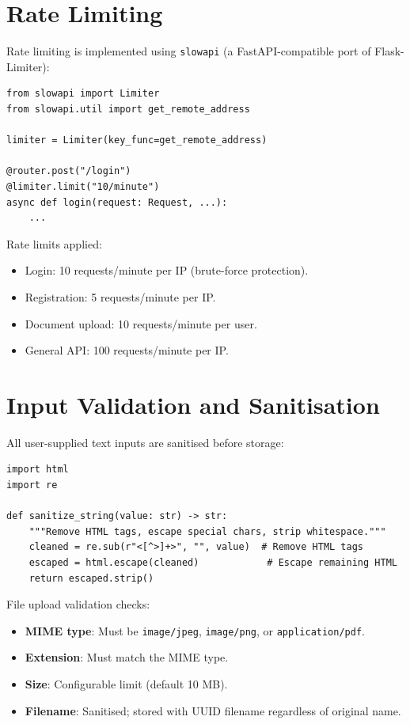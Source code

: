 \section{Rate Limiting}

Rate limiting is implemented using \texttt{slowapi} (a FastAPI-compatible port of Flask-Limiter):

\begin{lstlisting}[style=pythonstyle, caption=Rate Limiting Configuration]
from slowapi import Limiter
from slowapi.util import get_remote_address

limiter = Limiter(key_func=get_remote_address)

@router.post("/login")
@limiter.limit("10/minute")
async def login(request: Request, ...):
    ...
\end{lstlisting}

Rate limits applied:
\begin{itemize}
    \item Login: 10 requests/minute per IP (brute-force protection).
    \item Registration: 5 requests/minute per IP.
    \item Document upload: 10 requests/minute per user.
    \item General API: 100 requests/minute per IP.
\end{itemize}

\section{Input Validation and Sanitisation}

All user-supplied text inputs are sanitised before storage:

\begin{lstlisting}[style=pythonstyle, caption=Input Sanitisation]
import html
import re

def sanitize_string(value: str) -> str:
    """Remove HTML tags, escape special chars, strip whitespace."""
    cleaned = re.sub(r"<[^>]+>", "", value)  # Remove HTML tags
    escaped = html.escape(cleaned)            # Escape remaining HTML
    return escaped.strip()
\end{lstlisting}

File upload validation checks:
\begin{itemize}
    \item \textbf{MIME type}: Must be \texttt{image/jpeg}, \texttt{image/png}, or \texttt{application/pdf}.
    \item \textbf{Extension}: Must match the MIME type.
    \item \textbf{Size}: Configurable limit (default 10 MB).
    \item \textbf{Filename}: Sanitised; stored with UUID filename regardless of original name.
\end{itemize}

